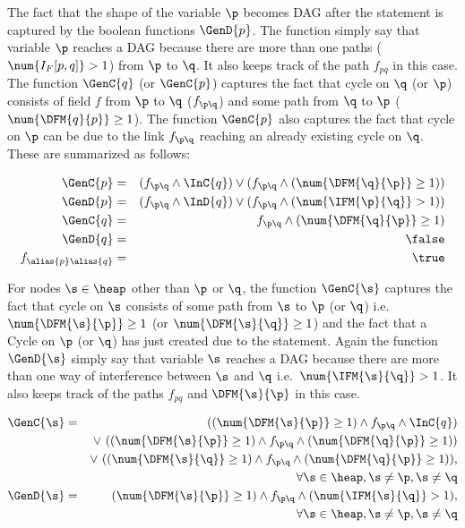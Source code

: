 \begin{enumerate}
 The fact that the shape of the variable $\p$
becomes DAG after the statement is captured by the boolean functions $\GenD{p}$. 
The function simply say that variable $\p$ reaches a DAG
because there are more than one paths ($\num{I_F[p,q]} > 1$)
from $\p$ to $\q$. It also keeps track of the path $f_{pq}$ in this case.
The function $\GenC{q}$ (or $\GenC{p}$)  captures the fact that cycle on $\q$ (or $\p$)
 consists of field $f$ from $\p$ to $\q$ ($f_{\p\q}$)
and some path from $\q$ to $\p$ ($\num{\DFM{q}{p}} \geq
1$). The function $\GenC{p}$ also captures the fact that cycle on $\p$
can be due to the link $f_{\p\q}$ reaching an already existing cycle on $\q$.
These are summarized as follows:


{\blue
  \begin{eqnarray*}
    \GenC{p}   &= & (f_{\p\q} \wedge \InC{q}) \vee (f_{\p\q}
    \wedge (\num{\DFM{\q}{\p}} \geq 1)) \\ %
    \GenD{p}   &=&  (f_{\p\q} \wedge \InD{q}) \vee ( f_{\p\q} \wedge (\num{\IFM{\p}{\q}} > 1) )	\\
    \GenC{q}   &= & f_{\p\q} \wedge (\num{\DFM{\q}{\p}} \geq 1) \\ %
	\GenD{q} &=& \false\\ 
    f_{\alias{p}\alias{q}} &=& \true \\
  \end{eqnarray*}
  }

For nodes $\s \in \heap$ other than $\p$ or $\q$, the function $\GenC{\s}$ 
captures the fact that cycle on $\s$ consists of some path from $\s$ to $\p$ (or $\q$) i.e.\ 
$\num{\DFM{\s}{\p}} \geq 1$ (or $\num{\DFM{\s}{\q}} \geq 1$)
and the fact that a Cycle on $\p$ (or $\q$) has just created due to the
statement. Again the function $\GenD{\s}$  simply say that variable $\s$ reaches a DAG
because there are more than one way of interference between $\s$ and $\q$ i.e.\ $\num{\IFM{\s}{\q}} > 1$. 
It also keeps track of the paths $f_{pq}$ and $\DFM{\s}{\p}$ in this case.

  \begin{eqnarray*}
    \GenC{\s} &=&  ((\num{\DFM{\s}{\p}} \geq 1) \wedge f_{\p\q}
    \wedge \InC{q}) \\
    && \vee\ ((\num{\DFM{\s}{\p}} \geq 1) \wedge f_{\p\q} \wedge
    (\num{\DFM{\q}{\p}} \geq 1)) \\ 
    && \vee\ ((\num{\DFM{\s}{\q}} \geq 1) \wedge f_{\p\q}
    \wedge (\num{\DFM{\q}{\p}} \geq 1)),  \\ %
    && \qquad \qquad  \forall \s \in \heap, \s \not= \p, \s \not=\q \\
    \GenD{\s}   &=& (\num{\DFM{\s}{\p}} \geq 1) \wedge
    f_{\p\q} \wedge (\num{\IFM{\s}{\q}} > 1), \\ %
    && \qquad \qquad \forall \s \in \heap, \s \not= \p, \s \not=\q 
  \end{eqnarray*}


\end{enumerate}
